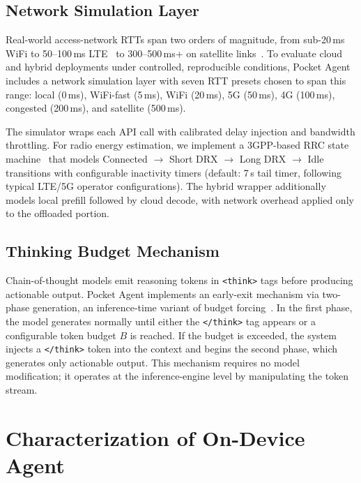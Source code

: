 \documentclass[sigconf,anonymous,review]{acmart}
\begin{document}
\subsection{Network Simulation Layer}

Real-world access-network RTTs span two orders of magnitude, from sub-20\,ms WiFi to 50--100\,ms LTE~\cite{huang2012close_look_power} to 300--500\,ms+ on satellite links~\cite{michel2022starlink}. To evaluate cloud and hybrid deployments under controlled, reproducible conditions, Pocket Agent includes a network simulation layer with seven RTT presets chosen to span this range: local (0\,ms), WiFi-fast (5\,ms), WiFi (20\,ms), 5G (50\,ms), 4G (100\,ms), congested (200\,ms), and satellite (500\,ms).

The simulator wraps each API call with calibrated delay injection and bandwidth throttling.
For radio energy estimation, we implement a 3GPP-based RRC state machine~\cite{huang2012close_look_power} that models Connected $\rightarrow$ Short DRX $\rightarrow$ Long DRX $\rightarrow$ Idle transitions with configurable inactivity timers (default: 7\,s tail timer, following typical LTE/5G operator configurations).
The hybrid wrapper additionally models local prefill followed by cloud decode, with network overhead applied only to the offloaded portion.

\subsection{Thinking Budget Mechanism}

Chain-of-thought models emit reasoning tokens in \texttt{<think>} tags before producing actionable output.
Pocket Agent implements an early-exit mechanism via two-phase generation, an inference-time variant of budget forcing~\cite{budgetforcing2025}.
In the first phase, the model generates normally until either the \texttt{</think>} tag appears or a configurable token budget $B$ is reached.
If the budget is exceeded, the system injects a \texttt{</think>} token into the context and begins the second phase, which generates only actionable output.
This mechanism requires no model modification; it operates at the inference-engine level by manipulating the token stream.

\section{Characterization of On-Device Agent}
\label{sec:ondevice}
\end{document}
